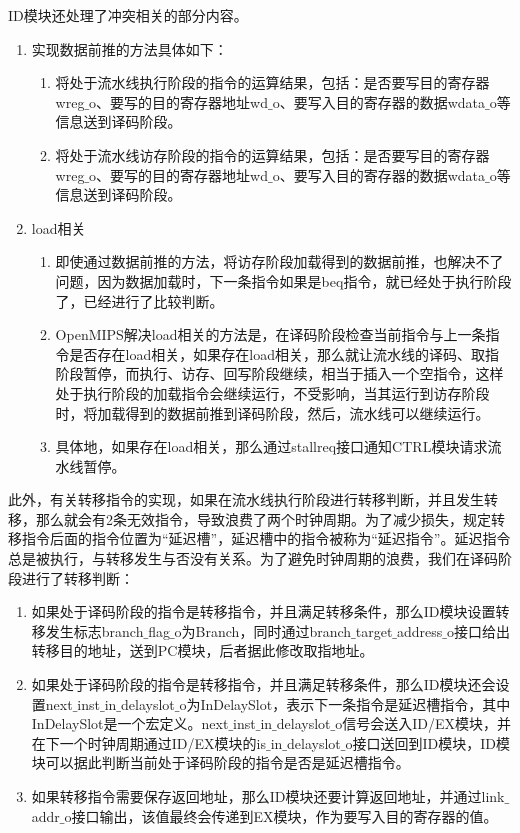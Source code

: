 ID模块还处理了冲突相关的部分内容。
\begin{enumerate}
	\item 实现数据前推的方法具体如下：
	\begin{enumerate}[(1)]
		\item 将处于流水线执行阶段的指令的运算结果，包括：是否要写目的寄存器wreg$\_$o、要写的目的寄存器地址wd$\_$o、要写入目的寄存器的数据wdata$\_$o等信息送到译码阶段。
	
		\item 将处于流水线访存阶段的指令的运算结果，包括：是否要写目的寄存器wreg$\_$o、要写的目的寄存器地址wd$\_$o、要写入目的寄存器的数据wdata$\_$o等信息送到译码阶段。
	\end{enumerate}
	\item load相关
	\begin{enumerate}[(1)]
		\item 即使通过数据前推的方法，将访存阶段加载得到的数据前推，也解决不了问题，因为数据加载时，下一条指令如果是beq指令，就已经处于执行阶段了，已经进行了比较判断。
		
		\item OpenMIPS解决load相关的方法是，在译码阶段检查当前指令与上一条指令是否存在load相关，如果存在load相关，那么就让流水线的译码、取指阶段暂停，而执行、访存、回写阶段继续，相当于插入一个空指令，这样处于执行阶段的加载指令会继续运行，不受影响，当其运行到访存阶段时，将加载得到的数据前推到译码阶段，然后，流水线可以继续运行。
		
		\item 具体地，如果存在load相关，那么通过stallreq接口通知CTRL模块请求流水线暂停。
	\end{enumerate}
\end{enumerate}


此外，有关转移指令的实现，如果在流水线执行阶段进行转移判断，并且发生转移，那么就会有2条无效指令，导致浪费了两个时钟周期。为了减少损失，规定转移指令后面的指令位置为“延迟槽”，延迟槽中的指令被称为“延迟指令”。延迟指令总是被执行，与转移发生与否没有关系。为了避免时钟周期的浪费，我们在译码阶段进行了转移判断：

\begin{enumerate}[(1)]
	\item 如果处于译码阶段的指令是转移指令，并且满足转移条件，那么ID模块设置转移发生标志branch$\_$flag$\_$o为Branch，同时通过branch$\_$target$\_$address$\_$o接口给出转移目的地址，送到PC模块，后者据此修改取指地址。
	
	\item 如果处于译码阶段的指令是转移指令，并且满足转移条件，那么ID模块还会设置next$\_$inst$\_$in$\_$delayslot$\_$o为InDelaySlot，表示下一条指令是延迟槽指令，其中InDelaySlot是一个宏定义。next$\_$inst$\_$in$\_$delayslot$\_$o信号会送入ID/EX模块，并在下一个时钟周期通过ID/EX模块的is$\_$in$\_$delayslot$\_$o接口送回到ID模块，ID模块可以据此判断当前处于译码阶段的指令是否是延迟槽指令。
	
	\item 如果转移指令需要保存返回地址，那么ID模块还要计算返回地址，并通过link$\_$addr$\_$o接口输出，该值最终会传递到EX模块，作为要写入目的寄存器的值。
\end{enumerate}

